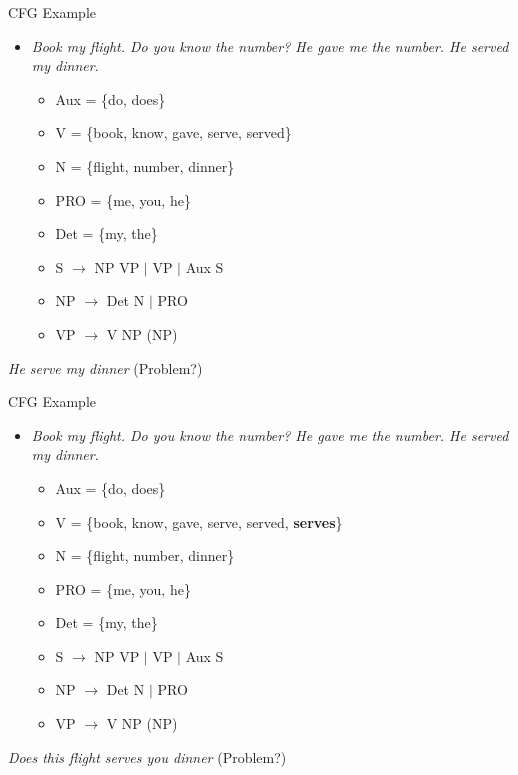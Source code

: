 \documentclass{beamer}
\begin{document}
\begin{frame}{CFG Example}
  \begin{itemize}
  \item {\it Book my flight. Do you know the number? He gave me the number. He served my dinner.}
    \begin{itemize}
    \item Aux = \{do, does\}
    \item V = \{book, know, gave, serve, served\}
    \item N = \{flight, number, dinner\} 
    \item PRO = \{me, you, he\}
    \item Det = \{my, the\}
    \item S $\rightarrow$ NP VP $\vert$ VP $\vert$ Aux S
    \item NP $\rightarrow$ Det N $\vert$ PRO
    \item VP $\rightarrow$ V NP (NP)
    \end{itemize}
  \end{itemize}
  
  {\it *He serve my dinner} (Problem?)
\end{frame}

\begin{frame}{CFG Example}
  \begin{itemize}
  \item {\it Book my flight. Do you know the number? He gave me the number. He served my dinner.}
    \begin{itemize}
    \item Aux = \{do, does\}
    \item V = \{book, know, gave, serve, served, {\bf serves}\}
    \item N = \{flight, number, dinner\} 
    \item PRO = \{me, you, he\}
    \item Det = \{my, the\}
    \item S $\rightarrow$ NP VP $\vert$ VP $\vert$ Aux S
    \item NP $\rightarrow$ Det N $\vert$ PRO
    \item VP $\rightarrow$ V NP (NP)
    \end{itemize}
  \end{itemize}
  {\it *Does this flight serves you dinner} (Problem?)
\end{frame}
\end{document}

